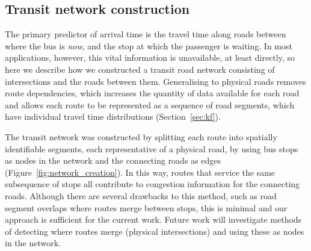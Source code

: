 \subsection{Transit network construction}
\label{sec:network_build}

The primary predictor of arrival time is 
the travel time along roads between where the bus is \emph{now},
and the stop at which the passenger is waiting.
In most applications, however, this vital information is unavailable,
at least directly,
so here we describe how we constructed a transit road network consisting of intersections
and the roads between them.
Generalising to physical roads removes route dependencies,
which increases the quantity of data available for each road
and allows each route to be represented as a sequence of road segments,
which have individual travel time distributions (Section~\ref{sec:kf}).


The transit network was constructed by splitting each route
into spatially identifiable segments,
each representative of a physical road,
by using bus stops as nodes in the network
and the connecting roads as edges
(Figure~\ref{fig:network_creation}).
In this way, routes that service the same subsequence of stops
all contribute to congestion information for the connecting roads.
Although there are several drawbacks to this method,
such as road segment overlaps where routes merge between stops,
this is minimal and our approach is sufficient for the current work.
Future work will investigate methods of detecting where routes merge
(physical intersections) and using these as nodes in the network.


